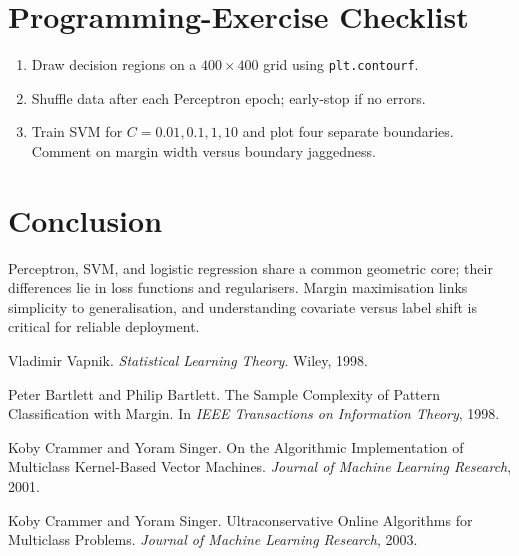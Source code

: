 \documentclass{article}
\begin{document}
\section{Programming-Exercise Checklist}\label{sec:prog}
\begin{enumerate}[label=\arabic*.]
\item Draw decision regions on a $400\times400$ grid using
      \texttt{plt.contourf}.
\item Shuffle data after each Perceptron epoch; early-stop if no errors.
\item Train SVM for $C=0.01,0.1,1,10$ and
      plot four separate boundaries.
      Comment on margin width versus boundary jaggedness.
\end{enumerate}

\section{Conclusion}
Perceptron, SVM, and logistic regression
share a common geometric core;
their differences lie in loss functions and regularisers.
Margin maximisation links simplicity to generalisation,
and understanding covariate versus label shift
is critical for reliable deployment.


\begin{thebibliography}{9}
Vladimir Vapnik.
\newblock \emph{Statistical Learning Theory}.
\newblock Wiley, 1998.%

Peter Bartlett and Philip Bartlett.
\newblock The Sample Complexity of Pattern Classification with Margin.
\newblock In \emph{IEEE Transactions on Information Theory}, 1998.%

Koby Crammer and Yoram Singer.
\newblock On the Algorithmic Implementation of Multiclass Kernel-Based Vector Machines.
\newblock \emph{Journal of Machine Learning Research}, 2001.%

Koby Crammer and Yoram Singer.
\newblock Ultraconservative Online Algorithms for Multiclass Problems.
\newblock \emph{Journal of Machine Learning Research}, 2003.%
\end{thebibliography}
\end{document}
